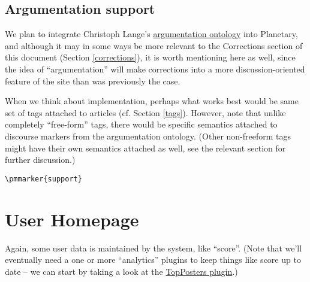 \documentclass{article}
\begin{document}
\subsection{Argumentation support} \label{argumentation}

We plan to integrate Christoph Lange's
\href{https://svn.salzburgresearch.at/svn/kiwi/IkeWiki/branches/SWiM/trunk/WEB-INF/ontologies/matharg/matharg.owl}{argumentation
  ontology} into Planetary, and although it may in some
ways be more relevant to the Corrections section of this
document (Section \ref{corrections}), it is worth
mentioning here as well, since the idea of
``argumentation'' will make corrections into a more
discussion-oriented feature of the site than was
previously the case.

When we think about implementation, perhaps what works
best would be same set of tags attached to articles
(cf. Section \ref{tags}).  However, note that unlike
completely ``free-form'' tags, there would be specific
semantics attached to discourse markers from the
argumentation ontology.  (Other non-freeform tags might
have their own semantics attached as well, see the
relevant section for further discussion.)

\begin{verbatim}
\pmmarker{support}
\end{verbatim}

\section{User Homepage} \label{users}

Again, some user data is maintained by the system, like
``score''.  (Note that we'll eventually need a one or more
``analytics'' plugins to keep things like score up to date
-- we can start by taking a look at the
\href{http://vanillaforums.org/addon/topposters-plugin}{TopPosters
  plugin}.)
\end{document}
